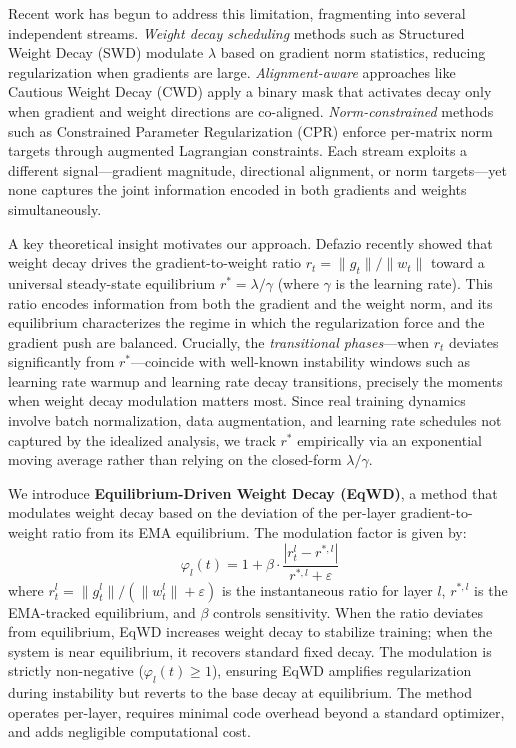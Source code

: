 \documentclass{article}
\begin{document}
Recent work has begun to address this limitation, fragmenting into
several independent streams. \emph{Weight decay scheduling} methods such
as Structured Weight Decay (SWD) \citep{xie2023swd} modulate $\lambda$
based on gradient norm statistics, reducing regularization when
gradients are large. \emph{Alignment-aware} approaches like Cautious
Weight Decay (CWD) \citep{chen2026cwd} apply a binary mask that activates
decay only when gradient and weight directions are co-aligned.
\emph{Norm-constrained} methods such as Constrained Parameter
Regularization (CPR) \citep{franke2024cpr} enforce per-matrix norm
targets through augmented Lagrangian constraints. Each stream exploits a
different signal---gradient magnitude, directional alignment, or norm
targets---yet none captures the joint information encoded in both
gradients and weights simultaneously.

A key theoretical insight motivates our approach. Defazio
\citep{defazio2025} recently showed that weight decay drives the
gradient-to-weight ratio $r_t = \|g_t\| / \|w_t\|$ toward a universal
steady-state equilibrium $r^* = \lambda / \gamma$ (where $\gamma$ is
the learning rate). This ratio encodes information from both the
gradient and the weight norm, and its equilibrium characterizes the
regime in which the regularization force and the gradient push are
balanced. Crucially, the \emph{transitional phases}---when $r_t$
deviates significantly from $r^*$---coincide with well-known
instability windows such as learning rate warmup and learning rate decay
transitions, precisely the moments when weight decay modulation matters
most. Since real training dynamics involve batch normalization, data
augmentation, and learning rate schedules not captured by the idealized
analysis, we track $r^*$ empirically via an exponential moving average
rather than relying on the closed-form $\lambda/\gamma$.

We introduce \textbf{Equilibrium-Driven Weight Decay (EqWD)}, a method
that modulates weight decay based on the deviation of the per-layer
gradient-to-weight ratio from its EMA equilibrium. The modulation factor
is given by:
\begin{equation}
\varphi_l(t) = 1 + \beta \cdot \frac{|r_t^l - r^{*,l}|}{r^{*,l} + \varepsilon}
\label{eq:modulation}
\end{equation}
where $r_t^l = \|g_t^l\| / (\|w_t^l\| + \varepsilon)$ is the
instantaneous ratio for layer $l$, $r^{*,l}$ is the EMA-tracked
equilibrium, and $\beta$ controls sensitivity. When the ratio deviates
from equilibrium, EqWD increases weight decay to stabilize training;
when the system is near equilibrium, it recovers standard fixed decay.
The modulation is strictly non-negative ($\varphi_l(t) \geq 1$),
ensuring EqWD amplifies regularization during instability but reverts to
the base decay at equilibrium. The method operates per-layer, requires
minimal code overhead beyond a standard optimizer, and adds negligible
computational cost.
\end{document}
